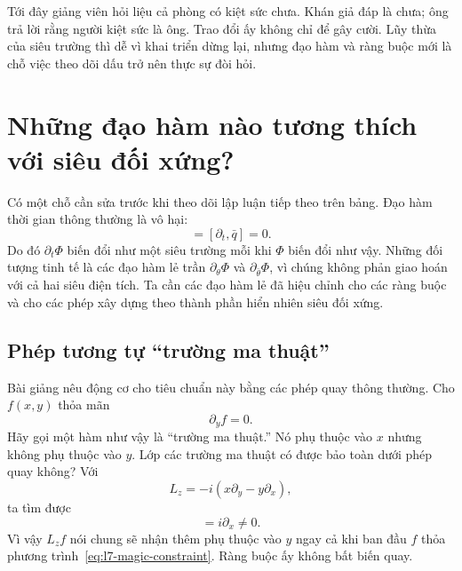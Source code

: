 Tới đây giảng viên hỏi liệu cả phòng có kiệt sức chưa. Khán giả đáp là chưa; ông trả lời rằng người kiệt sức là ông. Trao đổi ấy không chỉ để gây cười. Lũy thừa của siêu trường thì dễ vì khai triển dừng lại, nhưng đạo hàm và ràng buộc mới là chỗ việc theo dõi dấu trở nên thực sự đòi hỏi.

\section{Những đạo hàm nào tương thích với siêu đối xứng?}

Có một chỗ cần sửa trước khi theo dõi lập luận tiếp theo trên bảng. Đạo hàm thời gian thông thường là vô hại:
\begin{equation}
[\partial_t,q]=[\partial_t,\bar q]=0.
\end{equation}
Do đó \(\partial_t\Phi\) biến đổi như một siêu trường mỗi khi \(\Phi\) biến đổi như vậy. Những đối tượng tinh tế là các đạo hàm lẻ trần \(\partial_\theta\Phi\) và \(\partial_{\bar\theta}\Phi\), vì chúng không phản giao hoán với cả hai siêu điện tích. Ta cần các đạo hàm lẻ đã hiệu chỉnh cho các ràng buộc và cho các phép xây dựng theo thành phần hiển nhiên siêu đối xứng.

\subsection{Phép tương tự ``trường ma thuật''}

Bài giảng nêu động cơ cho tiêu chuẩn này bằng các phép quay thông thường. Cho \(f(x,y)\) thỏa mãn
\begin{equation}
\partial_y f=0.
\label{eq:l7-magic-constraint}
\end{equation}
Hãy gọi một hàm như vậy là ``trường ma thuật.'' Nó phụ thuộc vào \(x\) nhưng không phụ thuộc vào \(y\). Lớp các trường ma thuật có được bảo toàn dưới phép quay không? Với
\begin{equation}
L_z=-i\left(x\partial_y-y\partial_x\right),
\end{equation}
ta tìm được
\begin{equation}
[\partial_y,L_z]=i\partial_x\neq0.
\end{equation}
Vì vậy \(L_z f\) nói chung sẽ nhận thêm phụ thuộc vào \(y\) ngay cả khi ban đầu \(f\) thỏa phương trình~\eqref{eq:l7-magic-constraint}. Ràng buộc ấy không bất biến quay.

